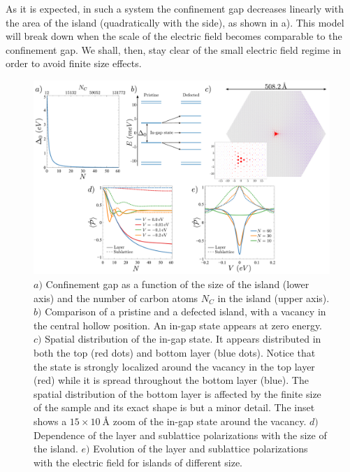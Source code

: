 As it is expected, in such a system the confinement gap decreases linearly with the area of the island (quadratically with the side), as shown in a). This model will break down when the scale of the electric field becomes comparable to the confinement gap. We shall, then, stay clear of the small electric field regime in order to avoid finite size effects.
\begin{figure}[!ht!]
\centering
\includegraphics[width=\textwidth]{artlat/fig/confinement.pdf}
\vspace{-20pt}
\caption{$a)$ Confinement gap as a function of the size of the island (lower axis) and the number of carbon atoms $N_C$ in the island (upper axis). $b)$ Comparison of a pristine and a defected island, with a vacancy in the central hollow position. An in-gap state appears at zero energy. $c)$ Spatial distribution of the in-gap state. It appears distributed in both the top (red dots) and bottom layer (blue dots). Notice that the state is strongly localized around the vacancy in the top layer (red) while it is spread throughout the bottom layer (blue). The spatial distribution of the bottom layer is affected by the finite size of the sample and its exact shape is but a minor detail. The inset shows a $15\times\SI{10}{\angstrom}$ zoom of the in-gap state around the vacancy. $d)$ Dependence of the layer and sublattice polarizations with the size of the island. $e)$ Evolution of the layer and sublattice polarizations with the electric field for islands of different size.}
\label{confinement}
\end{figure}

